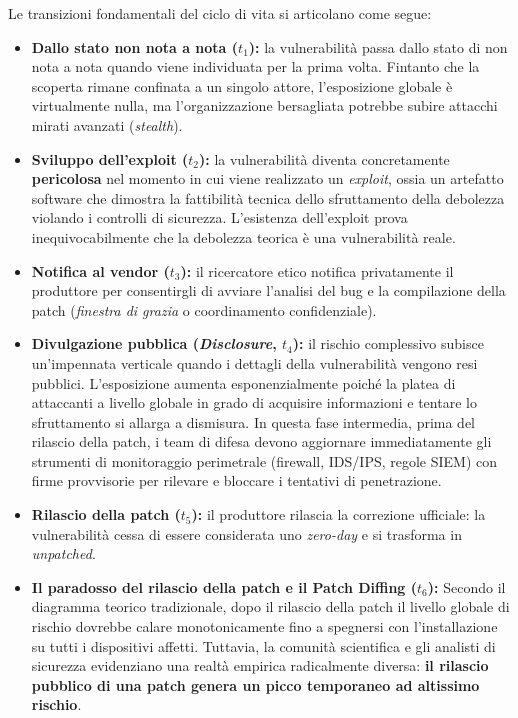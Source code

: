 \documentclass[../../main.tex]{subfiles}
\begin{document}
Le transizioni fondamentali del ciclo di vita si articolano come segue:
\begin{itemize}
    \item \textbf{Dallo stato non nota a nota ($t_1$):} la vulnerabilità passa dallo stato di non nota a nota quando viene individuata per la prima volta. Fintanto che la scoperta rimane confinata a un singolo attore, l'esposizione globale è virtualmente nulla, ma l'organizzazione bersagliata potrebbe subire attacchi mirati avanzati (\textit{stealth}).
    \item \textbf{Sviluppo dell'exploit ($t_2$):} la vulnerabilità diventa concretamente \textbf{pericolosa} nel momento in cui viene realizzato un \textit{exploit}, ossia un artefatto software che dimostra la fattibilità tecnica dello sfruttamento della debolezza violando i controlli di sicurezza. L'esistenza dell'exploit prova inequivocabilmente che la debolezza teorica è una vulnerabilità reale.
    \item \textbf{Notifica al vendor ($t_3$):} il ricercatore etico notifica privatamente il produttore per consentirgli di avviare l'analisi del bug e la compilazione della patch (\textit{finestra di grazia} o coordinamento confidenziale).
    \item \textbf{Divulgazione pubblica (\textit{Disclosure}, $t_4$):} il rischio complessivo subisce un'impennata verticale quando i dettagli della vulnerabilità vengono resi pubblici. L'esposizione aumenta esponenzialmente poiché la platea di attaccanti a livello globale in grado di acquisire informazioni e tentare lo sfruttamento si allarga a dismisura. In questa fase intermedia, prima del rilascio della patch, i team di difesa devono aggiornare immediatamente gli strumenti di monitoraggio perimetrale (firewall, IDS/IPS, regole SIEM) con firme provvisorie per rilevare e bloccare i tentativi di penetrazione.
    \item \textbf{Rilascio della patch ($t_5$):} il produttore rilascia la correzione ufficiale: la vulnerabilità cessa di essere considerata uno \textit{zero-day} e si trasforma in \textit{unpatched}.
    \item \textbf{Il paradosso del rilascio della patch e il Patch Diffing ($t_6$):} Secondo il diagramma teorico tradizionale, dopo il rilascio della patch il livello globale di rischio dovrebbe calare monotonicamente fino a spegnersi con l'installazione su tutti i dispositivi affetti. Tuttavia, la comunità scientifica e gli analisti di sicurezza evidenziano una realtà empirica radicalmente diversa: \textbf{il rilascio pubblico di una patch genera un picco temporaneo ad altissimo rischio}.
    

\end{itemize}
\end{document}
